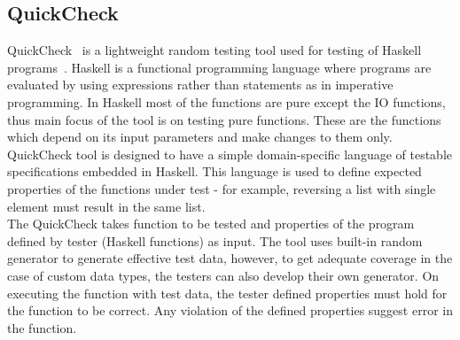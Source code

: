 
\subsection{QuickCheck}
QuickCheck~\cite{Claessen2000} is a lightweight random testing tool used for testing of Haskell programs~\cite{Hudak2007}. Haskell is a functional programming language where programs are evaluated by using expressions rather than statements as in imperative programming. In Haskell most of the functions are pure except the IO functions, thus main focus of the tool is on testing pure functions. These are the functions which depend on its input parameters and make changes to them only. QuickCheck tool is designed to have a simple domain-specific language of testable specifications embedded in Haskell. This language is used to define expected properties of the functions under test - for example, reversing a list with single element must result in the same list.\\ %
\indent The QuickCheck takes function to be tested and properties of the program defined by tester (Haskell functions) as input. The tool uses built-in random generator to generate effective test data, however, to get adequate coverage in the case of custom data types, the testers can also develop their own generator. On executing the function with test data, the tester defined properties must hold for the function to be correct. Any violation of the defined properties suggest error in the function.



